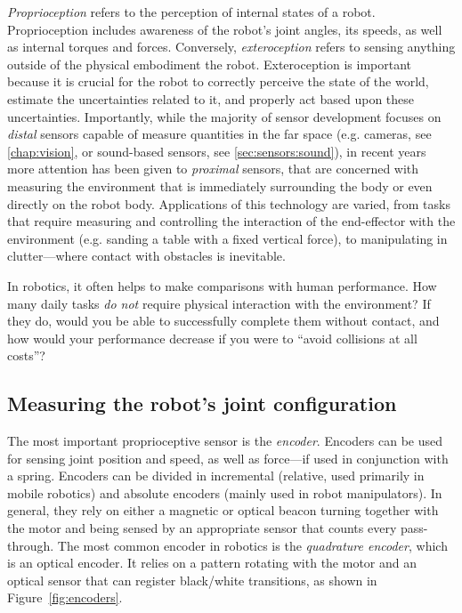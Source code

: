 \textsl{Proprioception}  refers to the perception of internal states of a robot.
Proprioception includes awareness of the robot's joint angles, its speeds, as well as internal torques and forces.
%
%
\label{sec:sensors:interaction}
%
Conversely, \textsl{exteroception} refers to sensing anything outside of the physical embodiment the robot. Exteroception is important because it is crucial for the robot to correctly perceive the state of the world, estimate the uncertainties related to it, and properly act based upon these uncertainties.
Importantly, while the majority of sensor development focuses on \textsl{distal} sensors capable of measure quantities in the far space (e.g. cameras, see \cref{chap:vision}, or sound-based sensors, see \cref{sec:sensors:sound}), in recent years more attention has been given to \textsl{proximal} sensors, that are concerned with measuring the environment that is immediately surrounding the body or even directly on the robot body.
Applications of this technology are varied, from tasks that require measuring and controlling the interaction of the end-effector with the environment (e.g. sanding a table with a fixed vertical force), to manipulating in clutter---where contact with obstacles is inevitable.

\begin{mdframed}
In robotics, it often helps to make comparisons with human performance.
How many daily tasks \textsl{do not} require physical interaction with the environment?
If they do, would you be able to successfully complete them without contact, and how would your performance decrease if you were to ``avoid collisions at all costs''?
\end{mdframed}

\subsection{Measuring the robot's joint configuration}

The most important proprioceptive sensor is the \textsl{encoder}. Encoders can be used for sensing joint position and speed, as well as force---if used in conjunction with a spring. Encoders can be divided in incremental (relative, used primarily in mobile robotics) and absolute encoders (mainly used in robot manipulators).
In general, they rely on either a magnetic or optical beacon turning together with the motor and being sensed by an appropriate sensor that counts every pass-through. The most common encoder in robotics is the \textsl{quadrature encoder}, which is an optical encoder. It relies on a pattern rotating with the motor and an optical sensor that can register black/white transitions, as shown in Figure~\ref{fig:encoders}.

